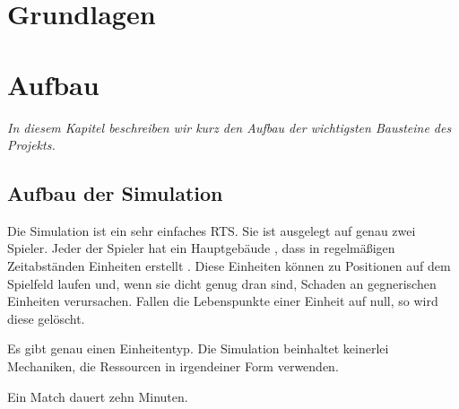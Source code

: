 \documentclass[
	12pt,
	a4paper,
	BCOR10mm,
	DIV14,
	headsepline,
	usegeometry,
]{scrreprt}
\begin{document}
\chapter{Grundlagen}
\label{basics}



\chapter{Aufbau}
\label{Aufbau}

\textit{%
In diesem Kapitel beschreiben wir kurz den Aufbau der wichtigsten Bausteine des Projekts.
}

\bigskip



\section{Aufbau der Simulation}
Die Simulation ist ein sehr einfaches RTS. 
Sie ist ausgelegt auf genau zwei Spieler. 
Jeder der Spieler hat ein Hauptgebäude , dass in regelmäßigen Zeitabständen Einheiten  erstellt . 
Diese Einheiten können zu Positionen auf dem Spielfeld laufen und, wenn sie dicht genug dran sind, Schaden an gegnerischen Einheiten verursachen. 
Fallen die Lebenspunkte einer Einheit auf null, so wird diese gelöscht.

Es gibt genau einen Einheitentyp. Die Simulation beinhaltet keinerlei Mechaniken, die Ressourcen in irgendeiner Form verwenden.

Ein Match dauert zehn Minuten.
\end{document}
